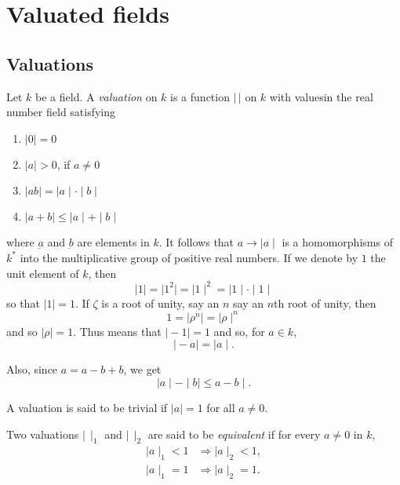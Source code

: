 \chapter{Valuated fields}%

\section{Valuations}\pageoriginale %

Let $k$ be a field. A \textit{valuation} on $ k $ is a function 
$| \, |$ on $k$ with values\break in the real number field satisfying   
\begin{enumerate}[(1)]
\item $ \mid 0\mid= 0 $

\item $ \mid a \mid > 0 $, if $ a \neq 0 $

\item $ \mid ab \mid =  \mid a \mid  \cdot \mid b \mid $

\item $ \mid a + b \mid  \leq  \mid a \mid   + \mid b \mid $
\end{enumerate}
where $ \underbar{a} $ and $ \underbar{b}$ are elements in $k$. It
follows that $ a \rightarrow \mid a \mid $  is a homomorphisms of $ k^*
$ into the multiplicative group of positive real numbers. If we denote
by $1$ the unit element of $ k $, then  
$$
\mid 1 \mid = \mid 1^2 \mid = \mid 1 \mid^2 = \mid 1 \mid \cdot  \mid 1
\mid  
$$
 so that $ \mid 1 \mid  = 1 $. If $ \zeta $ is a root of unity, say an
 $n$ say an $n$th root of unity, then  
 $$
 1 = \mid \rho^n \mid = \mid \rho \mid^n
 $$
 and so $ \mid \rho \mid =1 $. Thus means that $ \mid -1 \mid = 1 $
 and so, for $ a \in k $, 
 $$
 \mid -a \mid = \mid a \mid .
 $$

 Also, since $ a = a - b + b $, we get 
 $$
 \mid a \mid - \mid b \mid \leq a -b \mid .
 $$

 A valuation is said to be trivial if $ \mid a \mid = 1 $ for all $ a
 \neq 0 $. 
 
 Two valuations $ \mid \, \mid_1 $ and $ \mid \, \mid_2 $ are said to
 be  \textit{equivalent} if for every $ a \neq 0 $ in $ k $,   
 \begin{align*}
 \mid a \mid_1 < 1 &\Rightarrow  \mid a \mid_2 < 1 ,\\
\mid a \mid_1 = 1 &\Rightarrow  \mid a \mid_2 =  1.
\end{align*}\pageoriginale


